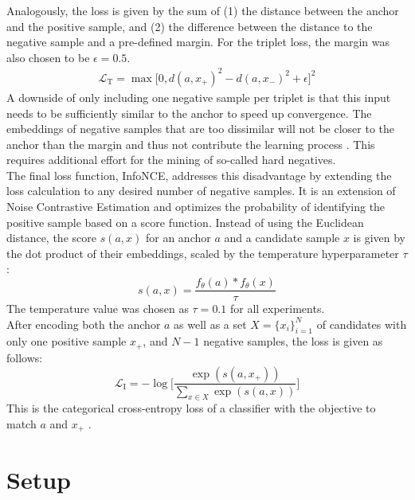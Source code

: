 \documentclass[11pt]{article}
\begin{document}
Analogously, the loss is given by the sum of (1) the distance between the anchor and the positive sample, and (2) the difference between the distance to the negative sample and a pre-defined margin.
For the triplet loss, the margin was also chosen to be $\epsilon=0.5$.
\begin{equation}\begin{split}
\label{eq:tripletLoss}
    \mathcal{L}_\text{T} = \max\biggl[0, d(a, x_+)^2 - d(a, x_-)^2 + \epsilon\biggr]^2
\end{split}\end{equation}
A downside of only including one negative sample per triplet is that this input needs to be sufficiently similar to the anchor to speed up convergence.
The embeddings of negative samples that are too dissimilar will not be closer to the anchor than the margin and thus not contribute the learning process \cite{schroff:2015}.
This requires additional effort for the mining of so-called hard negatives.\\
The final loss function, InfoNCE, addresses this disadvantage by extending the loss calculation to any desired number of negative samples. 
It is an extension of Noise Contrastive Estimation \cite{gutmann:2010} and optimizes the probability of identifying the positive sample based on a score function.
Instead of using the Euclidean distance, the score $s(a, x)$ for an anchor $a$ and a candidate sample $x$ is given by the dot product of their embeddings, scaled by the temperature hyperparameter $\tau$:
\begin{equation}
\label{eq:score}
    s(a, x) =  \frac{f_\theta(a) * f_\theta(x)}{\tau}
\end{equation}
The temperature value was chosen as $\tau=0.1$ for all experiments.\\
After encoding both the anchor $a$ as well as a set $X=\{x_i\}^N_{i=1}$ of candidates with only one positive sample $x_+$, and $N-1$ negative samples, the loss is given as follows:
\begin{equation}
\label{eq:infoLoss}
    \mathcal{L}_\text{I} = -\log \biggl[
    \frac{\exp (s(a, x_+))}
    {\sum_{x \in X} \exp (s(a, x))} \biggr]
\end{equation}
This is the categorical cross-entropy loss of a classifier with the objective to match $a$ and $x_+$ \cite{he:2019}.






\section{Setup}
\label{sec:setup}
\end{document}
